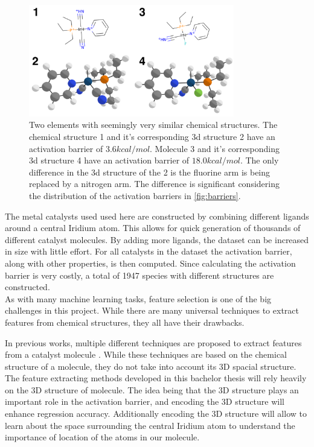 \begin{figure}
  \centering
  \includegraphics[width=0.8\textwidth]{figures/introduction/elems_intro.png}
  \caption{Two elements with seemingly very similar chemical structures. The chemical structure 1 and it's corresponding 3d structure 2 have an activation barrier of $3.6 kcal/mol$.
  Molecule 3 and it's corresponding 3d structure 4 have an activation barrier of $18.0 kcal/mol$.
  The only difference in the 3d structure of the 2 is the fluorine arm is being replaced by a nitrogen arm.
  The difference is significant considering the distribution of the activation barriers in \ref{fig:barriers}.  }
  \label{fig:struct-diff}
\end{figure}


The metal catalysts used used here are constructed by combining different ligands around a central Iridium atom.
This allows for quick generation of thousands of different catalyst molecules.
By adding more ligands, the dataset can be increased in size with little effort.
For all catalysts in the dataset the activation barrier, along with other properties, is then computed.
Since calculating the activation barrier is very costly, a total of 1947 species with different structures are constructed.
\\
As with many machine learning tasks, feature selection is one of the big challenges in this project.
While there are many universal techniques to extract features from chemical structures, they all have their drawbacks.

In previous works, multiple different techniques are proposed to extract features from a catalyst molecule \cite{friederich_dos}.
While these techniques are based on the chemical structure of a molecule, they do not take into account its 3D spacial structure.
The feature extracting methods developed in this bachelor thesis will rely heavily on the 3D structure of molecule.
The idea being that the 3D structure plays an important role in the activation barrier, and encoding the 3D structure will enhance regression accuracy.
Additionally encoding the 3D structure will allow to learn about the space surrounding the central 
Iridium atom to understand the importance of location of the atoms in our molecule.

